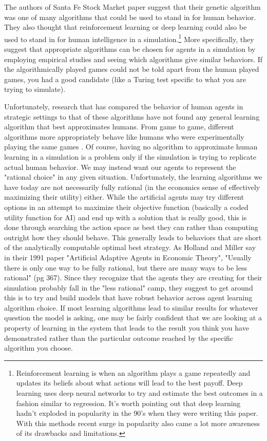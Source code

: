 \documentclass[12pt,twoside]{reedthesis}
\begin{document}
The authors of Santa Fe Stock Market paper suggest that their genetic algorithm was one of many algorithms that could be used to stand in for human behavior. They also thought that reinforcement learning or deep learning could also be used to stand in for human intelligence in a simulation.\footnote{Reinforcement learning is when an algorithm plays a game repeatedly and updates its beliefs about what actions will lead to the best payoff. Deep learning uses deep neural networks to try and estimate the best outcomes in a fashion similar to regression. It's worth pointing out that deep learning hadn't exploded in popularity in the 90's when they were writing this paper. With this methods recent surge in popularity also came a lot more awareness of its drawbacks and limitations.} More specifically, they suggest that appropriate algorithms can be chosen for agents in a simulation by employing empirical studies and seeing which algorithms give similar behaviors. If the algorithmically played games could not be told apart from the human played games, you had a good candidate (like a Turing test specific to what you are trying to simulate)\citep{Arthur1991}. 

Unfortunately, research that has compared the behavior of human agents in strategic settings to that of these algorithms have not found any general learning algorithm that best approximates humans. From game to game, different algorithms more appropriately behave like humans who were experimentally playing the same games \citep{Tesfatsion2002}. Of course, having no algorithm to approximate human learning in a simulation is a problem only if the simulation is trying to replicate actual human behavior. We may instead want our agents to represent the "rational choice" in any given situation. Unfortunately, the learning algorithms we have today are not necessarily fully rational (in the economics sense of effectively maximizing their utility) either. While the artificial agents may try different options in an attempt to maximize their objective function (basically a coded utility function for AI) and end up with a solution that is really good, this is done through searching the action space as best they can rather than computing outright how they should behave. This generally leads to behaviors that are short of the analytically computable optimal best strategy. As Holland and Miller say in their 1991 paper "Artificial Adaptive Agents in Economic Theory", "Usually there is only one way to be fully rational, but there are many ways to be less rational" (pg 367). Since they recognize that the agents they are creating for their simulation probably fall in the "less rational" camp, they suggest to get around this is to try and build models that have robust behavior across agent learning algorithm choice. If most learning algorithms lead to similar results for whatever question the model is asking, one may be fairly confident that we are looking at a property of learning in the system that leads to the result you think you have demonstrated rather than the particular outcome reached by the specific algorithm you choose.
\end{document}
